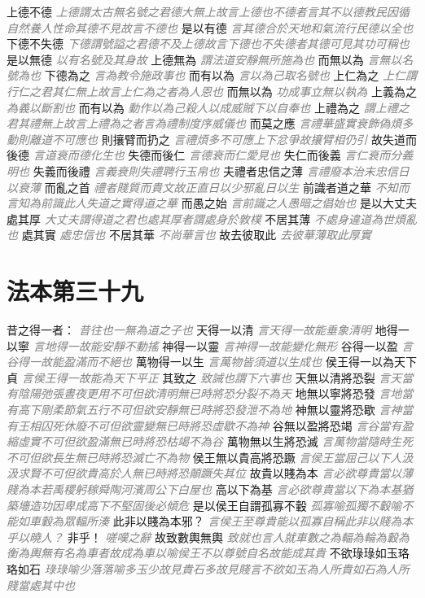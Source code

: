 \documentclass[a4paper,zihao=-4,oneside,landscape,UTF8]{ctexart}
\newcommand{\zhushi}[1]{\scriptsize{\textit{\textcolor{gray}{#1}}}\normalsize}
\begin{document}
上德不德
\zhushi{上德謂太古無名號之君德大無上故言上德也不德者言其不以德教民因循自然養人性命其德不見故言不德也}
是以有德
\zhushi{言其德合於天地和氣流行民德以全也}
下德不失德
\zhushi{下德謂號謚之君德不及上德故言下德也不失德者其德可見其功可稱也}
是以無德
\zhushi{以有名號及其身故}
上德無為
\zhushi{謂法道安靜無所施為也}
而無以為
\zhushi{言無以名號為也}
下德為之
\zhushi{言為教令施政事也}
而有以為
\zhushi{言以為己取名號也}
上仁為之
\zhushi{上仁謂行仁之君其仁無上故言上仁為之者為人恩也}
而無以為
\zhushi{功成事立無以執為}
上義為之
\zhushi{為義以斷割也}
而有以為
\zhushi{動作以為己殺人以成威賊下以自奉也}
上禮為之
\zhushi{謂上禮之君其禮無上故言上禮為之者言為禮制度序威儀也}
而莫之應
\zhushi{言禮華盛實衰飾偽煩多動則離道不可應也}
則攘臂而扔之
\zhushi{言禮煩多不可應上下忿爭故攘臂相仍引}
故失道而後德
\zhushi{言道衰而德化生也}
失德而後仁
\zhushi{言德衰而仁愛見也}
失仁而後義
\zhushi{言仁衰而分義明也}
失義而後禮
\zhushi{言義衰則失禮聘行玉帛也}
夫禮者忠信之薄
\zhushi{言禮廢本治末忠信日以衰薄}
而亂之首
\zhushi{禮者賤質而貴文故正直日以少邪亂日以生}
前識者道之華
\zhushi{不知而言知為前識此人失道之實得道之華}
而愚之始
\zhushi{言前識之人愚暗之倡始也}
是以大丈夫處其厚
\zhushi{大丈夫謂得道之君也處其厚者謂處身於敦樸}
不居其薄
\zhushi{不處身違道為世煩亂也}
處其實
\zhushi{處忠信也}
不居其華
\zhushi{不尚華言也}
故去彼取此
\zhushi{去彼華薄取此厚實}


\section{法本第三十九}


昔之得一者：
\zhushi{昔往也一無為道之子也}
天得一以清
\zhushi{言天得一故能垂象清明}
地得一以寧
\zhushi{言地得一故能安靜不動搖}
神得一以靈
\zhushi{言神得一故能變化無形}
谷得一以盈
\zhushi{言谷得一故能盈滿而不絕也}
萬物得一以生
\zhushi{言萬物皆須道以生成也}
侯王得一以為天下貞
\zhushi{言侯王得一故能為天下平正}
其致之
\zhushi{致誡也謂下六事也}
天無以清將恐裂
\zhushi{言天當有陰陽弛張晝夜更用不可但欲清明無已時將恐分裂不為天}
地無以寧將恐發
\zhushi{言地當有高下剛柔節氣五行不可但欲安靜無已時將恐發泄不為地}
神無以靈將恐歇
\zhushi{言神當有王相囚死休廢不可但欲靈變無已時將恐虛歇不為神}
谷無以盈將恐竭
\zhushi{言谷當有盈縮虛實不可但欲盈滿無已時將恐枯竭不為谷}
萬物無以生將恐滅
\zhushi{言萬物當隨時生死不可但欲長生無已時將恐滅亡不為物}
侯王無以貴高將恐蹶
\zhushi{言侯王當屈己以下人汲汲求賢不可但欲貴高於人無已時將恐顛蹶失其位}
故貴以賤為本
\zhushi{言必欲尊貴當以薄賤為本若禹稷躬稼舜陶河濱周公下白屋也}
高以下為基
\zhushi{言必欲尊貴當以下為本基猶築墻造功因卑成高下不堅固後必傾危}
是以侯王自謂孤寡不轂
\zhushi{孤寡喻孤獨不轂喻不能如車轂為眾輻所湊}
此非以賤為本邪？
\zhushi{言侯王至尊貴能以孤寡自稱此非以賤為本乎以曉人？}
非乎！
\zhushi{嗟嘆之辭}
故致數輿無輿
\zhushi{致就也言人就車數之為輻為輪為轂為衡為輿無有名為車者故成為車以喻侯王不以尊號自名故能成其貴}
不欲琭琭如玉珞珞如石
\zhushi{琭琭喻少落落喻多玉少故見貴石多故見賤言不欲如玉為人所貴如石為人所賤當處其中也}
\end{document}
